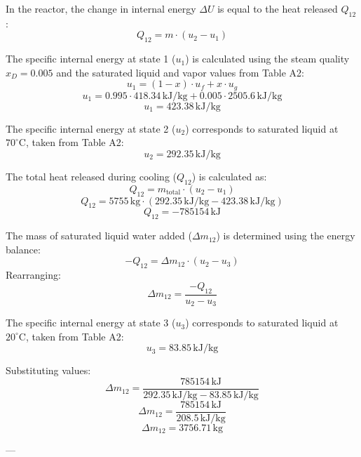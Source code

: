 In the reactor, the change in internal energy \( \Delta U \) is equal to the heat released \( Q_{12} \):  
\[
Q_{12} = m \cdot (u_2 - u_1)
\]  

The specific internal energy at state 1 (\( u_1 \)) is calculated using the steam quality \( x_D = 0.005 \) and the saturated liquid and vapor values from Table A2:  
\[
u_1 = (1 - x) \cdot u_f + x \cdot u_g  
\]  
\[
u_1 = 0.995 \cdot 418.34 \, \text{kJ/kg} + 0.005 \cdot 2505.6 \, \text{kJ/kg}  
\]  
\[
u_1 = 423.38 \, \text{kJ/kg}
\]  

The specific internal energy at state 2 (\( u_2 \)) corresponds to saturated liquid at \( 70^\circ \text{C} \), taken from Table A2:  
\[
u_2 = 292.35 \, \text{kJ/kg}
\]  

The total heat released during cooling (\( Q_{12} \)) is calculated as:  
\[
Q_{12} = m_{\text{total}} \cdot (u_2 - u_1)  
\]  
\[
Q_{12} = 5755 \, \text{kg} \cdot (292.35 \, \text{kJ/kg} - 423.38 \, \text{kJ/kg})  
\]  
\[
Q_{12} = -785154 \, \text{kJ}
\]  

The mass of saturated liquid water added (\( \Delta m_{12} \)) is determined using the energy balance:  
\[
-Q_{12} = \Delta m_{12} \cdot (u_2 - u_3)
\]  
Rearranging:  
\[
\Delta m_{12} = \frac{-Q_{12}}{u_2 - u_3}
\]  

The specific internal energy at state 3 (\( u_3 \)) corresponds to saturated liquid at \( 20^\circ \text{C} \), taken from Table A2:  
\[
u_3 = 83.85 \, \text{kJ/kg}
\]  

Substituting values:  
\[
\Delta m_{12} = \frac{785154 \, \text{kJ}}{292.35 \, \text{kJ/kg} - 83.85 \, \text{kJ/kg}}  
\]  
\[
\Delta m_{12} = \frac{785154 \, \text{kJ}}{208.5 \, \text{kJ/kg}}  
\]  
\[
\Delta m_{12} = 3756.71 \, \text{kg}
\]  

---